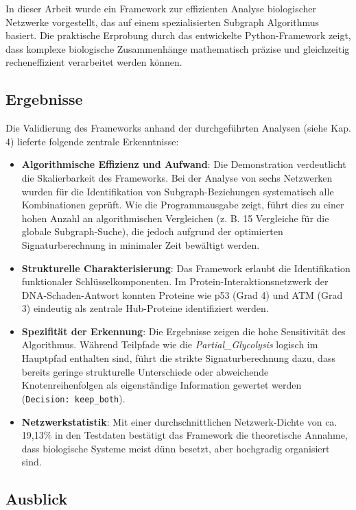 ﻿\documentclass[a4paper,12pt]{article}
\theoremstyle{definition}
\begin{document}
In dieser Arbeit wurde ein Framework zur effizienten Analyse biologischer Netzwerke vorgestellt, das auf einem spezialisierten Subgraph Algorithmus basiert. Die praktische Erprobung durch das entwickelte Python-Framework zeigt, dass komplexe biologische Zusammenhänge mathematisch präzise und gleichzeitig recheneffizient verarbeitet werden können.

\subsection{Ergebnisse}

Die Validierung des Frameworks anhand der durchgeführten Analysen (siehe Kap. 4) lieferte folgende zentrale Erkenntnisse:

\begin{itemize}
	\item \textbf{Algorithmische Effizienz und Aufwand}: Die Demonstration verdeutlicht die Skalierbarkeit des Frameworks. Bei der Analyse von sechs Netzwerken wurden für die Identifikation von Subgraph-Beziehungen systematisch alle Kombinationen geprüft. Wie die Programmausgabe zeigt, führt dies zu einer hohen Anzahl an algorithmischen Vergleichen (z. B. 15 Vergleiche für die globale Subgraph-Suche), die jedoch aufgrund der optimierten Signaturberechnung in minimaler Zeit bewältigt werden.
	\item \textbf{Strukturelle Charakterisierung}: Das Framework erlaubt die Identifikation funktionaler Schlüsselkomponenten. Im Protein-Interaktionsnetzwerk der DNA-Schaden-Antwort konnten Proteine wie p53 (Grad 4) und ATM (Grad 3) eindeutig als zentrale Hub-Proteine identifiziert werden.
	\item \textbf{Spezifität der Erkennung}: Die Ergebnisse zeigen die hohe Sensitivität des Algorithmus. Während Teilpfade wie die \textit{Partial\_Glycolysis} logisch im Hauptpfad enthalten sind, führt die strikte Signaturberechnung dazu, dass bereits geringe strukturelle Unterschiede oder abweichende Knotenreihenfolgen als eigenständige Information gewertet werden (\texttt{Decision: keep\_both}).
	\item \textbf{Netzwerkstatistik}: Mit einer durchschnittlichen Netzwerk-Dichte von ca. 19,13\% in den Testdaten bestätigt das Framework die theoretische Annahme, dass biologische Systeme meist dünn besetzt, aber hochgradig organisiert sind.
\end{itemize}

\subsection{Ausblick}
\end{document}
